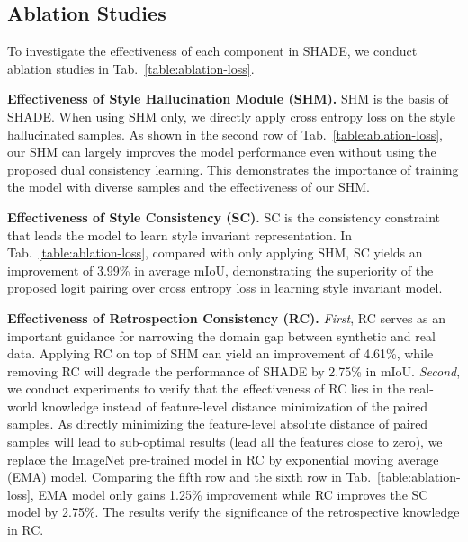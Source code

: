 \documentclass[runningheads]{llncs}
\newcommand{\ours}{SHADE\xspace}
\begin{document}
\subsection{Ablation Studies}
To investigate the effectiveness of each component in \ours, we conduct ablation studies in Tab.~\ref{table:ablation-loss}.

\noindent\textbf{Effectiveness of Style Hallucination Module (SHM).}
SHM is the basis of \ours. When using SHM only, we directly apply cross entropy loss on the style hallucinated samples. As shown in the second row of Tab.~\ref{table:ablation-loss}, our SHM can largely improves the model performance even without using the proposed dual consistency learning. This demonstrates the importance of training the model with diverse samples and the effectiveness of our SHM.


\noindent\textbf{Effectiveness of Style Consistency (SC).}
SC is the consistency constraint that leads the model to learn style invariant representation. In Tab.~\ref{table:ablation-loss}, compared with only applying SHM, SC yields an improvement of 3.99\% in average mIoU, demonstrating the superiority of the proposed logit pairing over cross entropy loss in learning style invariant model.


\noindent\textbf{Effectiveness of Retrospection Consistency (RC).}
\textit{First}, RC serves as an important guidance for narrowing the domain gap between synthetic and real data. Applying RC on top of SHM can yield an improvement of 4.61\%,
while removing RC will degrade the performance of \ours by 2.75\% in mIoU. 
\textit{Second}, we conduct experiments to verify that the effectiveness of RC lies in the real-world knowledge instead of feature-level distance minimization of the paired samples. 
As directly minimizing the feature-level absolute distance of paired samples will lead to sub-optimal results (lead all the features close to zero), we replace the ImageNet pre-trained model in RC by exponential moving average (EMA) model. Comparing the fifth row and the sixth row in Tab.~\ref{table:ablation-loss}, EMA model only gains 1.25\% improvement while RC improves the SC model by 2.75\%. The results verify the significance of the retrospective knowledge in RC.
\end{document}
